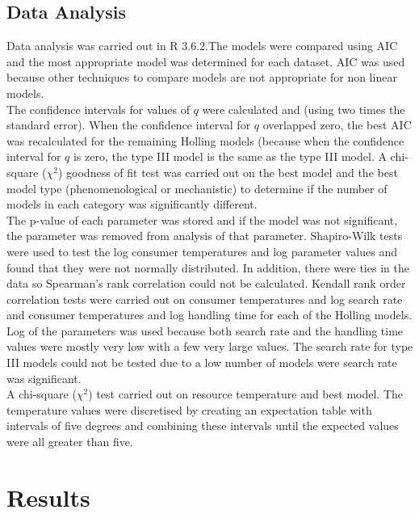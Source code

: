 \documentclass{article}
\begin{document}
\subsection{Data Analysis}
Data analysis was carried out in R 3.6.2\cite{RCoreTeam2017}.The models were compared using AIC and the most appropriate model was determined for each dataset. AIC was used because other techniques to compare models are not appropriate for non linear models.\\  %
The confidence intervals for values of $q$ were calculated and (using two times the standard error). When the confidence interval for $q$ overlapped zero, the best AIC was recalculated for the remaining Holling models (because when the confidence interval for $q$ is zero, the type III model is the same as the type III model.  %
A chi-square ($\chi^2$) goodness of fit test was carried out on the best model and the best model type (phenomenological or mechanistic) to determine if the number of models in each category was significantly different.\\
The p-value of each parameter was stored and if the model was not significant, the parameter was removed from analysis of that parameter. Shapiro-Wilk tests were used to test the log consumer temperatures and log parameter values and found that they were not normally distributed. In addition, there were ties in the data so Spearman's rank correlation could not be calculated.  Kendall rank order correlation tests were carried out on consumer temperatures and log search rate and consumer temperatures and log handling time for each of the Holling models. Log of the parameters was used because both search rate and the handling time values were mostly very low with  a few very large values. The search rate for type III models could not be tested due to a low number of models were search rate was significant. \\ 
A chi-square ($\chi^2$) test carried out on resource temperature and best model. The temperature values were discretised by creating an expectation table with intervals of five degrees and combining these intervals until the expected values were all greater than five.
\section{Results}
\end{document}
